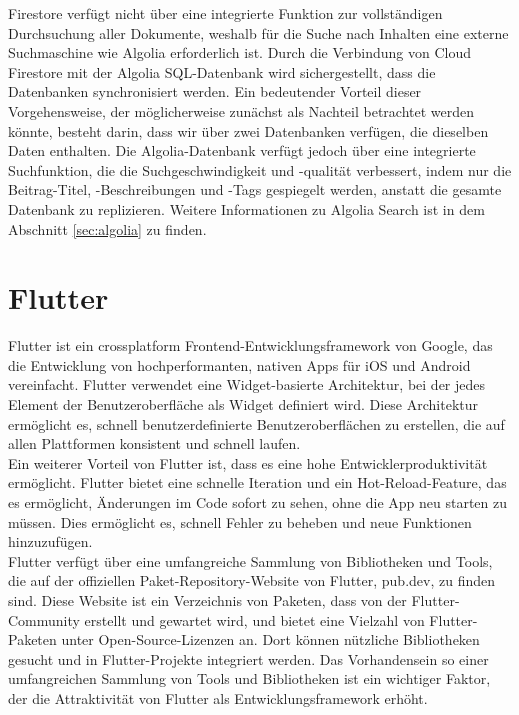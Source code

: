 Firestore verfügt nicht über eine integrierte Funktion zur
vollständigen Durchsuchung aller Dokumente, weshalb für die
Suche nach Inhalten eine externe Suchmaschine wie Algolia
erforderlich ist. Durch die Verbindung von Cloud Firestore
mit der Algolia SQL-Datenbank wird sichergestellt, dass die
Datenbanken synchronisiert werden. Ein bedeutender Vorteil
dieser Vorgehensweise, der möglicherweise zunächst als
Nachteil betrachtet werden könnte, besteht darin, dass wir
über zwei Datenbanken verfügen, die dieselben Daten
enthalten. Die Algolia-Datenbank verfügt jedoch über eine
integrierte Suchfunktion, die die Suchgeschwindigkeit und
-qualität verbessert, indem nur die Beitrag-Titel,
-Beschreibungen und -Tags gespiegelt werden, anstatt die
gesamte Datenbank zu replizieren. Weitere Informationen zu
Algolia Search ist in dem Abschnitt \ref{sec:algolia} zu finden.

\section{Flutter}

Flutter\cite{flutter} ist ein crossplatform Frontend-Entwicklungsframework von Google, das die Entwicklung von hochperformanten, nativen Apps für iOS und Android vereinfacht. Flutter verwendet eine Widget-basierte Architektur\cite{flutter_architecture}, bei der jedes Element der Benutzeroberfläche als Widget definiert wird. Diese Architektur ermöglicht es, schnell benutzerdefinierte Benutzeroberflächen zu erstellen, die auf allen Plattformen konsistent und schnell laufen.
\\
Ein weiterer Vorteil von Flutter ist, dass es eine hohe Entwicklerproduktivität ermöglicht. Flutter bietet eine schnelle Iteration und ein Hot-Reload-Feature, das es ermöglicht, Änderungen im Code sofort zu sehen, ohne die App neu starten zu müssen. Dies ermöglicht es, schnell Fehler zu beheben und neue Funktionen hinzuzufügen.
\\
Flutter verfügt über eine umfangreiche Sammlung von Bibliotheken und Tools, die auf der offiziellen Paket-Repository-Website von Flutter, pub.dev\cite{flutter_pub}, zu finden sind. Diese Website ist ein Verzeichnis von Paketen, dass von der Flutter-Community erstellt und gewartet wird, und bietet eine Vielzahl von Flutter-Paketen unter Open-Source-Lizenzen an. Dort können nützliche Bibliotheken gesucht und in Flutter-Projekte integriert werden. Das Vorhandensein so einer umfangreichen Sammlung von Tools und Bibliotheken ist ein wichtiger Faktor, der die Attraktivität von Flutter als Entwicklungsframework erhöht.


